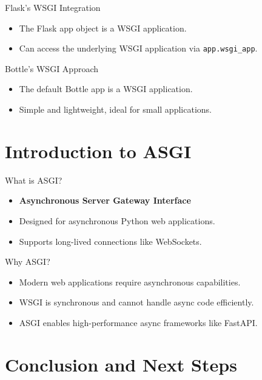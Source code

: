 \documentclass{beamer}
\begin{document}
\begin{frame}{Flask's WSGI Integration}
    \begin{itemize}
        \item The Flask app object is a WSGI application.
        \item Can access the underlying WSGI application via \texttt{app.wsgi\_app}.
    \end{itemize}
\end{frame}

\begin{frame}{Bottle's WSGI Approach}
    \begin{itemize}
        \item The default Bottle app is a WSGI application.
        \item Simple and lightweight, ideal for small applications.
    \end{itemize}
\end{frame}

\section{Introduction to ASGI}

\begin{frame}{What is ASGI?}
    \begin{itemize}
        \item \textbf{Asynchronous Server Gateway Interface}
        \item Designed for asynchronous Python web applications.
        \item Supports long-lived connections like WebSockets.
    \end{itemize}
\end{frame}

\begin{frame}{Why ASGI?}
    \begin{itemize}
        \item Modern web applications require asynchronous capabilities.
        \item WSGI is synchronous and cannot handle async code efficiently.
        \item ASGI enables high-performance async frameworks like FastAPI.
    \end{itemize}
\end{frame}

\section{Conclusion and Next Steps}
\end{document}
